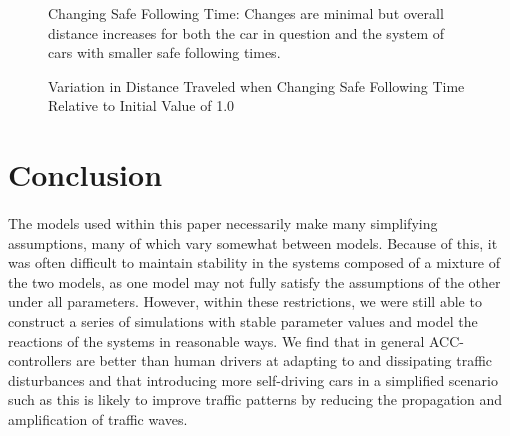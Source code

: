 \documentclass[12pt]{article}
\begin{document}
\begin{figure}[H]
  \centering
  \caption{Changing Safe Following Time: Changes are minimal but overall distance increases for both the car in question and the system of cars with smaller safe following times.}
\end{figure}

\begin{figure}[H]
  \centering
  \caption{Variation in Distance Traveled when Changing Safe Following Time Relative to Initial Value of 1.0}
\end{figure}

\section{Conclusion}
\paragraph{}The models used within this paper necessarily make many simplifying assumptions, many of which vary somewhat between models. Because of this, it was often difficult to maintain stability in the systems composed of a mixture of the two models, as one model may not fully satisfy the assumptions of the other under all parameters. However, within these restrictions, we were still able to construct a series of simulations with stable parameter values and model the reactions of the systems in reasonable ways. We find that in general ACC-controllers are better than human drivers at adapting to and dissipating traffic disturbances and that introducing more self-driving cars in a simplified scenario such as this is likely to improve traffic patterns by reducing the propagation and amplification of traffic waves. 
\end{document}
